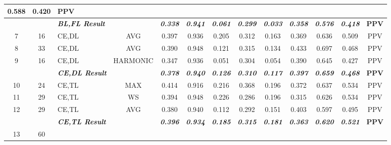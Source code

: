 \begin{table}[H]
{\begin{tabular}{cc|l|c|c|c|c|c|c|c|c|c|c|}
    0.588 &
    0.420 &
    PPV \\ \hline
  \textbf{} &
    \textit{\textbf{}} &
    \textit{\textbf{BL,FL Result}} &
    \textbf{} &
    \textit{\textbf{0.338}} &
    \textit{\textbf{0.941}} &
    \textit{\textbf{0.061}} &
    \textit{\textbf{0.299}} &
    \textit{\textbf{0.033}} &
    \textit{\textbf{0.358}} &
    \textit{\textbf{0.576}} &
    \textit{\textbf{0.418}} &
    \textbf{PPV} \\ \hline
  \multicolumn{1}{|c|}{7} &
    16 &
    CE,DL &
    AVG &
    0.397 &
    0.936 &
    0.205 &
    0.312 &
    0.163 &
    0.369 &
    0.636 &
    0.509 &
    PPV \\ \hline
  \multicolumn{1}{|c|}{8} &
    33 &
    CE,DL &
    AVG &
    0.390 &
    0.948 &
    0.121 &
    0.315 &
    0.134 &
    0.433 &
    0.697 &
    0.468 &
    PPV \\ \hline
  \multicolumn{1}{|c|}{9} &
    16 &
    CE,DL &
    HARMONIC &
    0.347 &
    0.936 &
    0.051 &
    0.304 &
    0.054 &
    0.390 &
    0.645 &
    0.427 &
    PPV \\ \hline
  \textbf{} &
    \textit{\textbf{}} &
    \textit{\textbf{CE,DL Result}} &
    \textbf{} &
    \textit{\textbf{0.378}} &
    \textit{\textbf{0.940}} &
    \textit{\textbf{0.126}} &
    \textit{\textbf{0.310}} &
    \textit{\textbf{0.117}} &
    \textit{\textbf{0.397}} &
    \textit{\textbf{0.659}} &
    \textit{\textbf{0.468}} &
    \textbf{PPV} \\ \hline
    \multicolumn{1}{|c|}{10} &
    24 &
    CE,TL &
    MAX &
    0.414 &
    0.916 &
    0.216 &
    0.368 &
    0.196 &
    0.372 &
    0.637 &
    0.534 &
    PPV \\ \hline
  \multicolumn{1}{|c|}{11} &
    29 &
    CE,TL &
    WS &
    0.394 &
    0.948 &
    0.226 &
    0.286 &
    0.196 &
    0.315 &
    0.626 &
    0.534 &
    PPV \\ \hline
  \multicolumn{1}{|c|}{12} &
    29 &
    CE,TL &
    AVG &
    0.380 &
    0.940 &
    0.112 &
    0.292 &
    0.151 &
    0.403 &
    0.597 &
    0.495 &
    PPV \\ \hline
  \textbf{} &
    \textit{\textbf{}} &
    \textit{\textbf{CE,TL Result}} &
    \textbf{} &
    \textit{\textbf{0.396}} &
    \textit{\textbf{0.934}} &
    \textit{\textbf{0.185}} &
    \textit{\textbf{0.315}} &
    \textit{\textbf{0.181}} &
    \textit{\textbf{0.363}} &
    \textit{\textbf{0.620}} &
    \textit{\textbf{0.521}} &
    \textbf{PPV} \\ \hline
  \multicolumn{1}{|c|}{13} &
    60 &

\end{tabular}}
\end{table}
